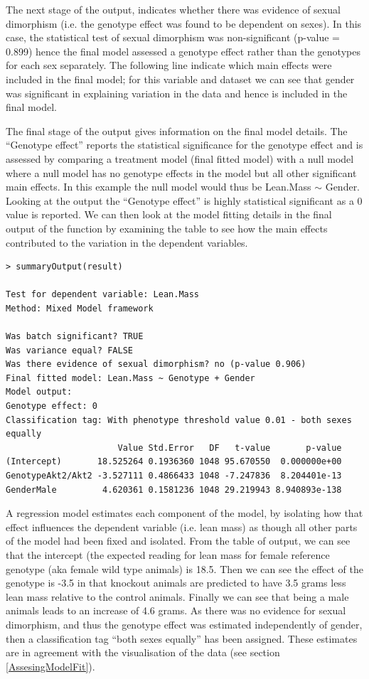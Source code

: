 \documentclass[12pt,a4paper]{article}
\begin{document}
The next stage of the output, indicates whether there was evidence of sexual dimorphism (i.e. the genotype effect was found to be dependent on sexes).  
In this case, the statistical test of sexual dimorphism was non-significant (p-value = 0.899) hence the final model assessed a genotype effect rather than the genotypes for each sex separately.  
The following line indicate which main effects were included in the final model; 
for this variable and dataset we can see that gender was significant in explaining variation in the data and hence is included in the final model. 

The final stage of the output gives information on the final model details.  
The “Genotype effect” reports the statistical significance for the genotype effect and is assessed by comparing a treatment model (final fitted model) with a null model where a null model 
has no genotype effects in the model but all other significant main effects.  
In this example the null model would thus be Lean.Mass $\sim$ Gender. Looking at the output the “Genotype effect” is highly statistical significant as a 0 value is reported.  
We can then look at the model fitting details in the final output of the function by examining the table to see how the main effects contributed to the variation in the dependent variables. 

\begingroup
    \fontsize{8pt}{12pt}\selectfont
\begin{verbatim}
> summaryOutput(result)

Test for dependent variable: Lean.Mass
Method: Mixed Model framework

Was batch significant? TRUE
Was variance equal? FALSE
Was there evidence of sexual dimorphism? no (p-value 0.906)
Final fitted model: Lean.Mass ~ Genotype + Gender
Model output:
Genotype effect: 0
Classification tag: With phenotype threshold value 0.01 - both sexes equally
                      Value Std.Error   DF   t-value       p-value
(Intercept)       18.525264 0.1936360 1048 95.670550  0.000000e+00
GenotypeAkt2/Akt2 -3.527111 0.4866433 1048 -7.247836  8.204401e-13
GenderMale         4.620361 0.1581236 1048 29.219943 8.940893e-138

\end{verbatim}
\endgroup 

A regression model estimates each component of the model, by isolating how that effect influences the dependent variable (i.e. lean mass) as though all other parts of the model had been fixed and isolated.   
From the table of output, we can see that the intercept (the expected reading for lean mass for female reference genotype (aka female wild type animals) is 18.5.  
Then we can see the effect of the genotype is -3.5 in that knockout animals are predicted to have 3.5 grams less lean mass relative to the control animals.  
Finally we can see that being a male animals leads to an increase of 4.6 grams.  
As there was no evidence for sexual dimorphism, and thus the genotype effect was estimated independently of gender, then a classification tag “both sexes equally” has been assigned.  
These estimates are in agreement with the visualisation of the data (see section \ref{AssesingModelFit}). 
\end{document}
